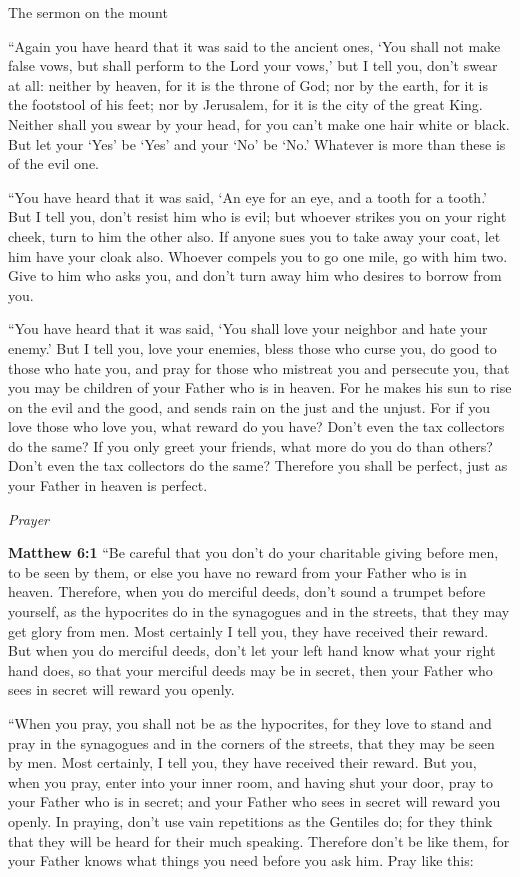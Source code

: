 \documentclass[10pt,twoside]{book}
\newcommand{\quotesize}{\normalsize{}}
\newenvironment{quotetext}{\begingroup\quotesize}{\endgroup}
\newcommand{\bible}[2]{\begin{quotetext}\textbf{#1} #2\end{quotetext}}
\newcommand{\matthew}[2]{\bible{Matthew #1}{#2}}
\newcommand{\subhead}[1]{\emph{#1}\par}
\begin{document}
\begin{section}{The sermon on the mount}
{   ``Again you have heard that it was said to the ancient ones, `You shall not make false vows, but shall perform to the Lord your vows,'    but I tell you, don't swear at all: neither by heaven, for it is the throne of God;    nor by the earth, for it is the footstool of his feet; nor by Jerusalem, for it is the city of the great King.    Neither shall you swear by your head, for you can't make one hair white or black.    But let your `Yes' be `Yes' and your `No' be `No.' Whatever is more than these is of the evil one.

   ``You have heard that it was said, `An eye for an eye, and a tooth for a tooth.'    But I tell you, don't resist him who is evil; but whoever strikes you on your right cheek, turn to him the other also.    If anyone sues you to take away your coat, let him have your cloak also.    Whoever compels you to go one mile, go with him two.    Give to him who asks you, and don't turn away him who desires to borrow from you.

   ``You have heard that it was said, `You shall love your neighbor  and hate your enemy.'    But I tell you, love your enemies, bless those who curse you, do good to those who hate you, and pray for those who mistreat you and persecute you,    that you may be children of your Father who is in heaven. For he makes his sun to rise on the evil and the good, and sends rain on the just and the unjust.    For if you love those who love you, what reward do you have? Don't even the tax collectors do the same?    If you only greet your friends, what more do you do than others? Don't even the tax collectors do the same?    Therefore you shall be perfect, just as your Father in heaven is perfect.
}

\subhead{Prayer}

\matthew{6:1}{
    ``Be careful that you don't do your charitable giving before men, to be seen by them, or else you have no reward from your Father who is in heaven.    Therefore, when you do merciful deeds, don't sound a trumpet before yourself, as the hypocrites do in the synagogues and in the streets, that they may get glory from men. Most certainly I tell you, they have received their reward.    But when you do merciful deeds, don't let your left hand know what your right hand does,    so that your merciful deeds may be in secret, then your Father who sees in secret will reward you openly.

   ``When you pray, you shall not be as the hypocrites, for they love to stand and pray in the synagogues and in the corners of the streets, that they may be seen by men. Most certainly, I tell you, they have received their reward.    But you, when you pray, enter into your inner room, and having shut your door, pray to your Father who is in secret; and your Father who sees in secret will reward you openly.    In praying, don't use vain repetitions as the Gentiles do; for they think that they will be heard for their much speaking.    Therefore don't be like them, for your Father knows what things you need before you ask him.    Pray like this:
}


\end{section}
\end{document}
